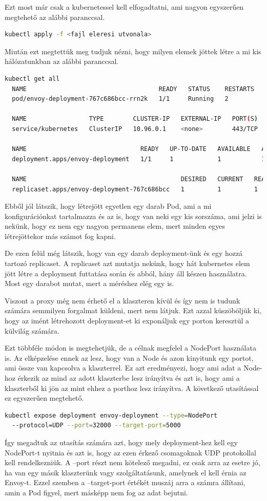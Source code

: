\documentclass[a4paper,oneside]{article}
\begin{document}
Ezt most már csak a kubernetessel kell elfogadtatni, ami nagyon egyszerűen
megtehető az alábbi paranccsal.
\begin{lstlisting}[language=bash]
  kubectl apply -f <fajl eleresi utvonala>
\end{lstlisting}
Miután ezt megtettük meg tudjuk nézni, hogy milyen elemek jöttek létre a
mi kis hálózatunkban az alábbi paranccsal.
\begin{lstlisting}[language=bash]
  kubectl get all
  NAME                                    READY   STATUS    RESTARTS   AGE
  pod/envoy-deployment-767c686bcc-rrn2k   1/1     Running   2          10d

  NAME                 TYPE        CLUSTER-IP   EXTERNAL-IP   PORT(S)   AGE
  service/kubernetes   ClusterIP   10.96.0.1    <none>        443/TCP   12d

  NAME                               READY   UP-TO-DATE   AVAILABLE   AGE
  deployment.apps/envoy-deployment   1/1     1            1           10d

  NAME                                          DESIRED   CURRENT   READY   AGE
  replicaset.apps/envoy-deployment-767c686bcc   1         1         1       10d
\end{lstlisting}
Ebből jól látszik, hogy létrejött egyetlen egy darab Pod, ami a mi konfigurációnkat
tartalmazza és az is, hogy van neki egy kis sorszáma, ami jelzi is nekünk, hogy
ez nem egy nagyon permanens elem, mert minden egyes létrejöttekor más számot fog
kapni.

De ezen felül még látszik, hogy van egy darab deployment-ünk és egy hozzá
tartozó replicaset. A replicaset azt mutatja nekünk, hogy hát kubernetes elem
jött létre a deployment futtatása során és abból, hány áll készen használatra.
Most egy darabot mutat, mert a méréshez elég egy is.

Viszont a proxy még nem érhető el a klaszteren kívül és így nem is tudunk
számára semmilyen forgalmat küldeni, mert nem látjuk. Ezt azzal küszöböljük ki,
hogy az imént létrehozott deployment-et ki exponáljuk egy porton keresztül a külvilág
számára.

Ezt többféle módon is megtehetjük, de a célnak megfelel a NodePort használata is.
Az elképzelése ennek az lesz, hogy van a Node és azon kinyitunk egy portot, ami
össze van kapcsolva a klaszterrel. Ez azt eredményezi, hogy ami adat a Node-hoz
érkezik az mind az adott klaszterbe lesz irányítva és azt is, hogy ami a klaszterből
ki jön az mint ehhez a porthoz lesz irányítva. A következő utasítással ez
egyszerűen megtehető.
\begin{lstlisting}[language=bash]
  kubectl expose deployment envoy-deployment --type=NodePort
  --protocol=UDP --port=32000 --target-port=5000
\end{lstlisting}
Így megadtuk az utasítás számára azt, hogy mely deployment-hez kell egy
NodePort-t nyitnia és azt is, hogy az ezen érkező csomagoknak UDP protokollal
kell rendelkezniük. A --port részt nem kötelező megadni, ez csak arra az esetre
jó, ha van egy másik klaszterünk vagy szolgáltatásunk, amelynek el kell érnia
az Envoy-t. Ezzel szemben a --target-port értékét muszáj arra a számra állítani,
amin a Pod figyel, mert másképp nem fog az adat bejutni.
\end{document}
